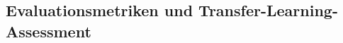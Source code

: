\documentclass[11pt,a4paper]{article}
\begin{document}
    \subsection{Evaluationsmetriken und Transfer-Learning-Assessment}
\end{document}
